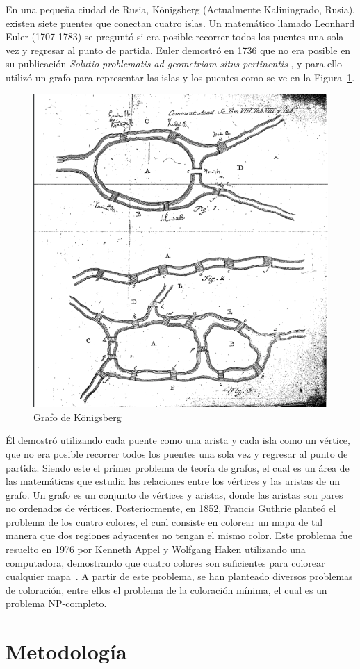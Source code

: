 \documentclass[9pt,a4paper,twoside]{tau-class/tau}
\begin{document}
    En una pequeña ciudad de Rusia, K\"onigsberg (Actualmente Kaliningrado, Rusia), existen siete puentes que conectan cuatro islas. Un matemático llamado Leonhard Euler (1707-1783) 
    se preguntó si era posible recorrer todos los puentes una sola vez y regresar al punto de partida. 
    Euler demostró en 1736 que no era posible en su publicación \textit{Solutio problematis ad geometriam situs pertinentis} \cite{euler1736}, y 
    para ello utilizó un grafo para representar las islas y los puentes como se ve en la Figura~\ref*{fig:konigsberg}. 
    \begin{figure}[H]
        \centering
        \includegraphics[width=0.5\columnwidth]{Images/Proy/Euler.png }
        \caption{Grafo de K\"onigsberg}
        \label{fig:konigsberg}
    \end{figure}
    Él demostró utilizando cada puente como una arista y cada isla como un vértice, que no era posible recorrer todos los puentes una sola vez y regresar al punto de partida.
    Siendo este el primer problema de teoría de grafos, el cual es un área de las matemáticas que estudia las relaciones entre los vértices y las aristas de un grafo.  
    Un grafo es un conjunto de vértices y aristas, donde las aristas son pares no ordenados de vértices.
    Posteriormente, en 1852, Francis Guthrie planteó el problema de los cuatro colores, el cual consiste en colorear un mapa de tal manera que dos regiones adyacentes no tengan el mismo color.
    Este problema fue resuelto en 1976 por Kenneth Appel y Wolfgang Haken utilizando una computadora, demostrando que cuatro colores son suficientes para colorear cualquier mapa~\cite{appel1976}.
    A partir de este problema, se han planteado diversos problemas de coloración, entre ellos el problema de la coloración mínima, el cual es un problema NP-completo.
    
\section{Metodología}
\end{document}
